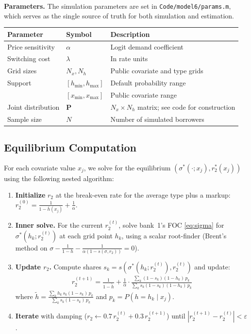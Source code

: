 \documentclass[12pt]{article}
\theoremstyle{plain}
\theoremstyle{plain}
\theoremstyle{definition}  %
\theoremstyle{remark}  %
\begin{document}
\textbf{Parameters.} The simulation parameters are set in \texttt{Code/model6/params.m}, which serves as the single source of truth for both simulation and estimation.
\begin{center}
\renewcommand{\arraystretch}{1.3}
\begin{tabular}{lll}
\toprule
\textbf{Parameter} & \textbf{Symbol} & \textbf{Description} \\
\midrule
Price sensitivity & $\alpha$ & Logit demand coefficient \\
Switching cost & $\lambda$ & In rate units \\
Grid sizes & $N_x, N_h$ & Public covariate and type grids \\
Support & $[h_{\min}, h_{\max}]$ & Default probability range \\
 & $[x_{\min}, x_{\max}]$ & Public covariate range \\
Joint distribution & $\mathbf{P}$ & $N_x \times N_h$ matrix; see code for construction \\
Sample size & $N$ & Number of simulated borrowers \\
\bottomrule
\end{tabular}
\end{center}

\subsection{Equilibrium Computation}\label{sec:eq_comp}

For each covariate value $x_j$, we solve for the equilibrium $(\sigma^*(\cdot; x_j), r_2^*(x_j))$ using the following nested algorithm:

\begin{enumerate}
    \item \textbf{Initialize} $r_2$ at the break-even rate for the average type plus a markup: $r_2^{(0)} = \frac{1}{1-\bar{h}(x_j)} + \frac{1}{\alpha}$.
    
    \item \textbf{Inner solve.} For the current $r_2^{(t)}$, solve bank~1's FOC \eqref{eq:sigma} for $\sigma^*(h_k; r_2^{(t)})$ at each grid point $h_k$, using a scalar root-finder (Brent's method on $\sigma - \frac{1}{1-h} - \frac{1}{\alpha(1-s(\sigma, r_2))} = 0$).
    
    \item \textbf{Update $r_2$.} Compute shares $s_k = s(\sigma^*(h_k; r_2^{(t)}), r_2^{(t)})$ and update:
    \begin{align*}
        r_2^{(t+1)} = \frac{1}{1-\tilde{h}} + \frac{1}{\alpha} \cdot \frac{\sum_k (1-s_k)(1-h_k)\, p_k}{\sum_k s_k(1-s_k)(1-h_k)\, p_k}
    \end{align*}
    where $\tilde{h} = \frac{\sum_k h_k\, s_k(1-s_k)\, p_k}{\sum_k s_k(1-s_k)\, p_k}$ and $p_k = P(h = h_k \mid x_j)$.
    
    \item \textbf{Iterate} with damping ($r_2 \leftarrow 0.7\, r_2^{(t)} + 0.3\, r_2^{(t+1)}$) until $|r_2^{(t+1)} - r_2^{(t)}| < \varepsilon$.
\end{enumerate}
\end{document}
